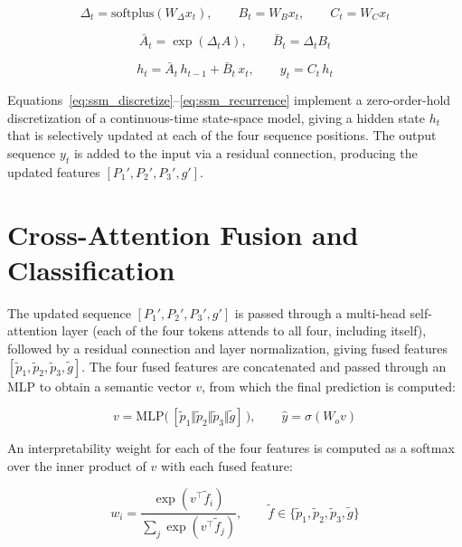 \documentclass[12pt, a4paper, openright, twoside]{report}
\begin{document}
\begin{equation}
\Delta_t = \mathrm{softplus}(W_{\Delta} x_t), \qquad B_t = W_B x_t, \qquad C_t = W_C x_t
\label{eq:ssm_params}
\end{equation}

\begin{equation}
\bar{A}_t = \exp(\Delta_t A), \qquad \bar{B}_t = \Delta_t B_t
\label{eq:ssm_discretize}
\end{equation}

\begin{equation}
h_t = \bar{A}_t \, h_{t-1} + \bar{B}_t \, x_t, \qquad y_t = C_t \, h_t
\label{eq:ssm_recurrence}
\end{equation}

Equations~\ref{eq:ssm_discretize}--\ref{eq:ssm_recurrence} implement a zero-order-hold discretization of a continuous-time state-space model, giving a hidden state $h_t$ that is selectively updated at each of the four sequence positions. The output sequence $y_t$ is added to the input via a residual connection, producing the updated features $[P_1', P_2', P_3', g']$.

\section{Cross-Attention Fusion and Classification}

The updated sequence $[P_1', P_2', P_3', g']$ is passed through a multi-head self-attention layer (each of the four tokens attends to all four, including itself), followed by a residual connection and layer normalization, giving fused features $[\tilde{p}_1, \tilde{p}_2, \tilde{p}_3, \tilde{g}]$. The four fused features are concatenated and passed through an MLP to obtain a semantic vector $v$, from which the final prediction is computed:

\begin{equation}
v = \mathrm{MLP}\big(\,[\tilde{p}_1 \Vert \tilde{p}_2 \Vert \tilde{p}_3 \Vert \tilde{g}]\,\big), \qquad \hat{y} = \sigma(W_o v)
\label{eq:classifier}
\end{equation}

An interpretability weight for each of the four features is computed as a softmax over the inner product of $v$ with each fused feature:

\begin{equation}
w_i = \frac{\exp(v^{\top} \tilde{f}_i)}{\sum_{j} \exp(v^{\top} \tilde{f}_j)}, \qquad \tilde{f} \in \{\tilde{p}_1, \tilde{p}_2, \tilde{p}_3, \tilde{g}\}
\label{eq:interpretability}
\end{equation}
\end{document}
